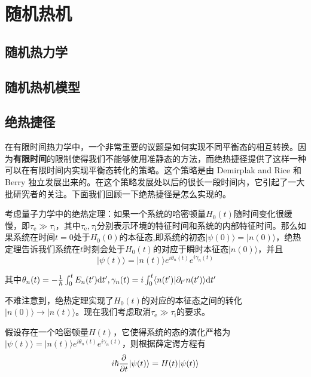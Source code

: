 \chapter{随机热机}
\section{随机热力学}

\section{随机热机模型}

\section{绝热捷径}
\qquad 在有限时间热力学中，一个非常重要的议题是如何实现不同平衡态的相互转换。因为\textbf{有限时间}的限制使得我们不能够使用准静态的方法，而绝热捷径\cite{Chen2010}提供了这样一种可以在有限时间内实现平衡态转化的策略。这个策略是由 Demirplak and Rice \cite{Demirplak2003}和 Berry \cite{Berry2009} 独立发展出来的。在这个策略发展处以后的很长一段时间内，它引起了一大批研究者的关注。下面我们回顾一下绝热捷径是怎么实现的。

考虑量子力学中的绝热定理\cite{Griffiths2018}：如果一个系统的哈密顿量$H_0(t)$随时间变化很缓慢，即$\tau_\mathrm{e} \gg \tau_\mathrm{i}$，其中$\tau_\mathrm{e}, \tau_\mathrm{i}$分别表示环境的特征时间和系统的内部特征时间。那么如果系统在时间$t=0$处于$H_0 (0)$的本征态,即系统的初态$| \psi(0) \rangle = | n(0) \rangle$，绝热定理告诉我们系统在$t$时刻会处于$H_0 (t)$的对应于瞬时本征态$| n(0) \rangle$，并且
\begin{equation}
    |\psi(t)\rangle=|n(t)\rangle e^{i \theta_{n}(t)} e^{i \gamma_{n}(t)}
    \label{eq2.1}
\end{equation}

其中$\theta_{n}(t)=-\frac{1}{\hbar} \int_{0}^{t} E_{n}(t^{\prime}) \mathrm{d} t^{\prime}, \gamma_{n}(t)=i \int_{0}^{t}\langle n(t^{\prime}) | \partial_{t^{\prime}}n(t^{\prime})\rangle \mathrm{d} t^{\prime}$

不难注意到，绝热定理实现了$H_0(t)$的对应的本征态之间的转化$| n(0) \rangle \to | n(t) \rangle$。现在我们考虑取消$\tau_\mathrm{e} \gg \tau_\mathrm{i}$的要求。

假设存在一个哈密顿量$H(t)$，它使得系统的态的演化严格为$|\psi(t)\rangle=|n(t)\rangle e^{i \theta_{n}(t)} e^{i \gamma_{n}(t)}$，则根据薛定谔方程有
\begin{equation}
    i \hbar \frac{\partial }{\partial t} |\psi(t)\rangle= H(t) |\psi(t)\rangle
    \label{eq2.2}
\end{equation}

